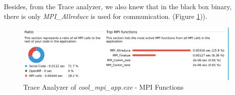 \documentclass[article]{scrartcl}
\begin{document}
Besides, from the Trace analyzer, we also knew that in the black box binary, there is only \textit{MPI\_Allreduce} is used for communication. (Figure \ref{fig:trace_4.3})).
\begin{figure}[htpb]
	\centering
	\includegraphics[width=.9\textwidth,keepaspectratio=true]{../figs/4_2_MPI_Functions.png}
	\caption{Trace Analyzer of \textit{cool\_mpi\_app.exe} - MPI Functions}
	\label{fig:trace_4.3}
\end{figure}
\end{document}
